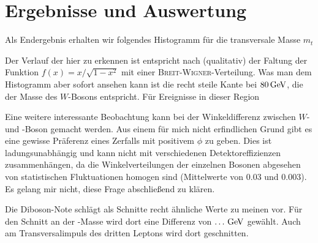 \section{Ergebnisse und Auswertung}
Als Endergebnis erhalten wir folgendes Histogramm für die transversale Masse
$m_t$

\begin{center}
  
\end{center}

Der Verlauf der hier zu erkennen ist entspricht nach\cite{transv} (qualitativ)
der Faltung der Funktion $f(x) = x/\sqrt{1-x^2}$ mit einer
\textsc{Breit}-\textsc{Wigner}-Verteilung. Was man dem Histogramm aber sofort
ansehen kann ist die recht steile Kante bei $\unit[80]{GeV}$, die der Masse des
$W$-Bosons entspricht. Für Ereignisse in dieser Region 

Eine weitere interessante Beobachtung kann bei der Winkeldifferenz zwischen $W$-
und \Z-Boson gemacht werden. Aus einem für mich nicht erfindlichen Grund gibt es
eine gewisse Präferenz eines Zerfalls mit positivem $\phi$ zu geben. Dies ist
ladungsunabhängig und kann nicht mit verschiedenen Detektoreffizienzen
zusammenhängen, da die Winkelverteilungen der einzelnen Bosonen abgesehen von
statistischen Fluktuationen homogen sind (Mittelwerte von $0.03$ und $0.003$).
Es gelang mir nicht, diese Frage abschließend zu klären.

\begin{center}
  
\end{center}

Die Diboson-Note schlägt als Schnitte recht ähnliche Werte zu meinen vor. Für
den Schnitt an der \Z-Masse wird dort eine Differenz von $\unit[\dots]{GeV}$
gewählt. Auch am Transversalimpuls des dritten Leptons wird dort geschnitten.
